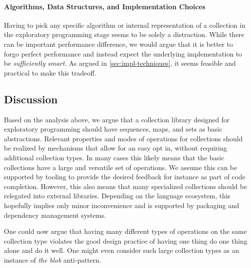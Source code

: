 \documentclass[sigconf, 10pt]{acmart}
\begin{document}
\paragraph{Algorithms, Data Structures, and Implementation Choices}

Having to pick any specific algorithm or internal representation of a collection
in the exploratory programming stage seems to be solely a distraction.
While there can be important performance difference,
we would argue that it is better to forgo perfect performance
and instead expect the underlying implementation
to be \emph{sufficiently smart}.
As argued in \cref{sec:impl-techniques},
it seems feasible and practical to make this tradeoff.


\subsection{Discussion}

Based on the analysis above,
we argue that a collection library designed for exploratory programming
should have sequences, maps, and sets as basic abstractions.
Relevant properties and modes of operations for collections should be
realized by mechanisms that allow for an easy opt in,
without requiring additional collection types.
In many cases this likely means
that the basic collections have a large and versatile set of operations.
We assume this can be supported by tooling to provide the desired feedback
for instance as part of code completion.
However, this also means that many specialized collections should be relegated
into external libraries.
Depending on the language ecosystem,
this hopefully implies only minor inconvenience
and is supported by packaging and dependency management systems.

One could now argue that having many different types of operations
on the same collection type violates the good design practice
of having one thing do one thing alone and do it well.
One might even consider such large collection types as
an instance of \emph{the blob} anti-pattern.\citep{brown1998antipatterns}
\end{document}
